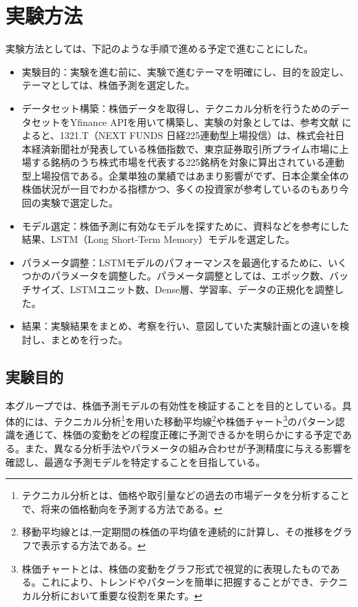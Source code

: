\documentclass[a4paper, 11pt, titlepage]{jsarticle}
\begin{document}
\section{実験方法}
実験方法としては、下記のような手順で進める予定で進むことにした。
\begin{itemize}
  \item 実験目的：実験を進む前に、実験で進むテーマを明確にし、目的を設定し、テーマとしては、株価予測を選定した。
  \item データセット構築：株価データを取得し、テクニカル分析を行うためのデータセットをYfinance APIを用いて構築し、実験の対象としては、参考文献 \cite{nikei}によると、1321.T（NEXT FUNDS 日経225連動型上場投信）は、株式会社日本経済新聞社が発表している株価指数で、東京証券取引所プライム市場に上場する銘柄のうち株式市場を代表する225銘柄を対象に算出されている連動型上場投信である。企業単独の業績ではあまり影響がでず、日本企業全体の株価状況が一目でわかる指標かつ、多くの投資家が参考しているのもあり今回の実験で選定した。
  \item モデル選定：株価予測に有効なモデルを探すために、資料などを参考にした結果、LSTM（Long Short-Term Memory）モデルを選定した。
  \item パラメータ調整：LSTMモデルのパフォーマンスを最適化するために、いくつかのパラメータを調整した。パラメータ調整としては、エポック数、バッチサイズ、LSTMユニット数、Dense層、学習率、データの正規化を調整した。
  \item 結果：実験結果をまとめ、考察を行い、意図していた実験計画との違いを検討し、まとめを行った。
\end{itemize}
\subsection{実験目的}
\indent 本グループでは、株価予測モデルの有効性を検証することを目的としている。具体的には、テクニカル分析\footnote{テクニカル分析とは、価格や取引量などの過去の市場データを分析することで、将来の価格動向を予測する方法である。}を用いた移動平均線\footnote{移動平均線とは,一定期間の株価の平均値を連続的に計算し、その推移をグラフで表示する方法である。}や株価チャート\footnote{株価チャートとは、株価の変動をグラフ形式で視覚的に表現したものである。これにより、トレンドやパターンを簡単に把握することができ、テクニカル分析において重要な役割を果たす。}のパターン認識を通じて、株価の変動をどの程度正確に予測できるかを明らかにする予定である。また、異なる分析手法やパラメータの組み合わせが予測精度に与える影響を確認し、最適な予測モデルを特定することを目指している。
\end{document}
